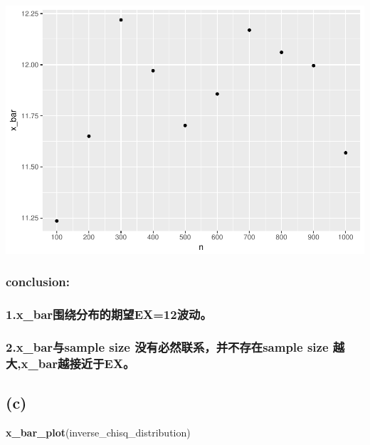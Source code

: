 \documentclass[]{article}
\newenvironment{Shaded}{\begin{snugshade}}{\end{snugshade}}
\newcommand{\KeywordTok}[1]{\textcolor[rgb]{0.13,0.29,0.53}{\textbf{{#1}}}}
\newcommand{\NormalTok}[1]{{#1}}
\begin{document}
\includegraphics{advEconometric_homework_files/figure-latex/unnamed-chunk-3-1.pdf}

\subsubsection{conclusion:}\label{conclusion-1}

\subsubsection{1.x\_bar围绕分布的期望EX=12波动。}\label{xux5fbarex12}

\subsubsection{2.x\_bar与sample size 没有必然联系，并不存在sample size
越大,x\_bar越接近于EX。}\label{xux5fbarsample-size-sample-size-xux5fbarex}

 \newpage

\subsection{(c)}\label{c}

\begin{Shaded}
\begin{Highlighting}[]
\KeywordTok{x_bar_plot}\NormalTok{(inverse_chisq_distribution)}
\end{Highlighting}
\end{Shaded}
\end{document}
